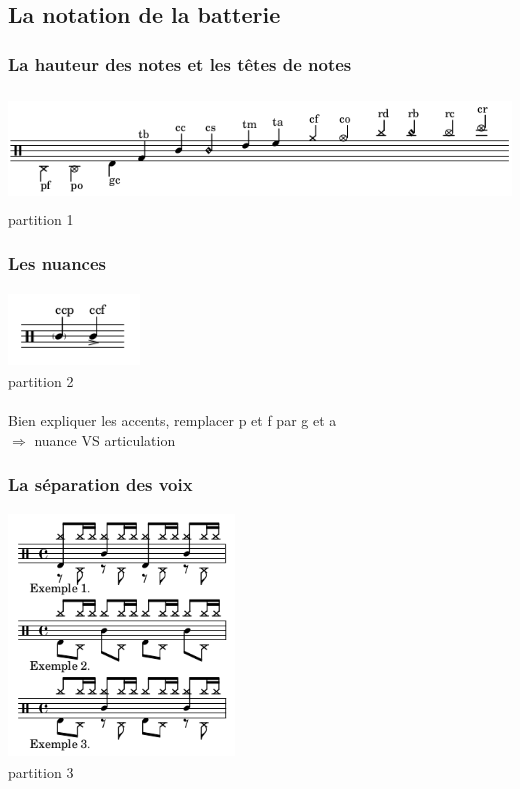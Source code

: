 \subsection{La notation de la batterie}
\subsubsection{La hauteur des notes et les têtes de notes}
\includegraphics[height=30mm, width=155mm]{z_images/1_description_notation/notes.png}
partition 1
\subsubsection{Les nuances}
\includegraphics[height=20mm, width=35mm]{z_images/1_description_notation/nuances.png}\\
partition 2\\\\
Bien expliquer les accents, remplacer p et f par g et a\\
$\Rightarrow$ nuance VS articulation\\
\subsubsection{La séparation des voix}
\includegraphics[height=65mm, width=60mm]{z_images/1_description_notation/separation/0_exemples_separation.png}\\
partition 3

